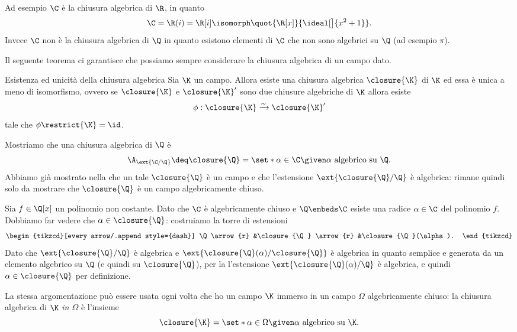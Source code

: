 Ad esempio $\C$ è la chiusura algebrica di $\R$, in quanto \[
    \C = \R(i) = \R[i] \isomorph \quot{\R[x]}{\ideal[\big]{x^2 + 1}}.
\] Invece $\C$ non è la chiusura algebrica di $\Q$ in quanto esistono elementi di $\C$ che non sono algebrici su $\Q$ (ad esempio $\pi$).

Il seguente teorema ci garantisce che possiamo sempre considerare la chiusura algebrica di un campo dato.
\begin{theorem}
    {Esistenza ed unicità della chiusura algebrica}{}
    Sia $\K$ un campo. Allora esiste una chiusura algebrica $\closure{\K}$ di $\K$ ed essa è unica a meno di isomorfismo, ovvero se $\closure{\K}$ e $\closure{\K}'$ sono due chiusure algebriche di $\K$ allora esiste \[
        \phi : \closure{\K} \xrightarrow{\sim} \closure{\K}'
    \] tale che $\phi\restrict{\K} = \id$. 
\end{theorem}

Mostriamo che una chiusura algebrica di $\Q$ è \[
    \A_{\ext{\C / \Q}} \deq \closure{\Q} = \set*{\alpha \in \C \given \alpha \text{ algebrico su } \Q}.
\] Abbiamo già mostrato nella  che un tale $\closure{\Q}$ è un campo e che l'estensione $\ext{\closure{\Q} / \Q}$ è algebrica: rimane quindi solo da mostrare che $\closure{\Q}$ è un campo algebricamente chiuso.

Sia $f \in \Q[x]$ un polinomio non costante. Dato che $\C$ è algebricamente chiuso e $\Q \embeds \C$ esiste una radice $\alpha \in \C$ del polinomio $f$. Dobbiamo far vedere che $\alpha \in \closure{\Q}$: costruiamo la torre di estensioni \begin{equation*}
    \begin{tikzcd}[every arrow/.append style={dash}]
        \Q \arrow{r} &\closure{\Q} \arrow{r} &\closure{\Q}(\alpha).
    \end{tikzcd}
\end{equation*}
Dato che $\ext{\closure{\Q} / \Q}$ è algebrica e $\ext{\closure{\Q}(\alpha) / \closure{\Q}}$ è algebrica in quanto semplice e generata da un elemento algebrico su $\Q$ (e quindi su $\closure{\Q}$), per la  l'estensione $\ext{\closure{\Q}(\alpha) / \Q}$ è algebrica, e quindi $\alpha \in \closure{\Q}$ per definizione.

\begin{remark}
    La stessa argomentazione può essere usata ogni volta che ho un campo $\K$ immerso in un campo $\Omega$ algebricamente chiuso: la chiusura algebrica di $\K$ \emph{in $\Omega$} è l'insieme \[
        \closure{\K} = \set*{\alpha \in \Omega \given \alpha \text{ algebrico su } \K}.
    \]
\end{remark}

